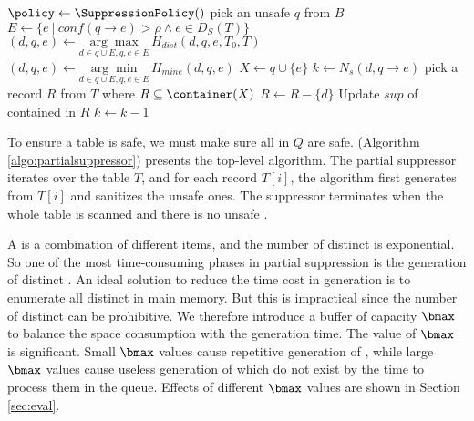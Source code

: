 \begin{algorithm}[th]
\caption{$\SanitizeBuffer(T_0, T, B)$}
\label{algo:sanitize}
\begin{algorithmic}[1]
\STATE $\policy \leftarrow \SuppressionPolicy()$ \label{choose_heur}
\REPEAT
\label{algo:pick_rs}
    \STATE pick an unsafe \qid $q$ from $B$
    \STATE $E \gets \{e ~|~ conf(q \rightarrow e) > \rho \land  e \in D_S(T)\}$
        \STATE $(d, q, e) \gets\underset{d\in q\cup E, q, e \in E}{\arg\max}\,H_{dist}(d, q, e, T_0, T)$
        \label{algo:heur_dist}
        \STATE $(d, q, e) \gets\underset{d\in q\cup E, q, e \in E}{\arg\min}\,H_{mine}(d, q, e)$
        \label{algo:heur_mine}
    \ENDIF
    \STATE $X\leftarrow q\cup\{e\}$
    \STATE $k\leftarrow N_s(d,q \rightarrow e)$\label{line:sanitize-k}
    \label{line:sanitize-whilek}
        \STATE pick a record $R$ from $T$ where
		$R\subseteq \container(X)$ \label{pick_row}
        \STATE $R\leftarrow R-\{d\}$\label{line:sanitize-suppress}
        \STATE Update $sup$ of \qids contained in $R$
        \label{algo:update_kl}
        \STATE $k \leftarrow k-1$
    \ENDWHILE
{}   \label{algo:pick_re}
\end{algorithmic}
\end{algorithm}

To ensure a table is safe, we must make sure all \qids in $Q$ are safe.
\PartialSuppressor (Algorithm \ref{algo:partialsuppressor}) presents the
top-level algorithm. The partial suppressor iterates over the table $T$, and
for each record $T[i]$, the algorithm first generates  \qids from $T[i]$ and
sanitizes the unsafe ones. The suppressor terminates when the whole table is
scanned and there is no unsafe \qid.

A \qid is a combination of different items,
  and the number of distinct \qids is exponential.
So one of the most time-consuming phases in partial suppression is
  the generation of distinct \qids.
An ideal solution to reduce the time cost in \qid generation is to enumerate
all distinct \qids in main memory. But this is impractical since the number
of distinct \qids can be prohibitive. We therefore introduce a \qid buffer of
capacity $\bmax$ to balance the space consumption with the generation time.
The value of $\bmax$ is significant. Small $\bmax$ values cause
repetitive generation of \qids, while large $\bmax$ values cause useless
generation of \qids which do not exist by the time to process them in the
queue. Effects of different $\bmax$ values are
shown in Section \ref{sec:eval}.

